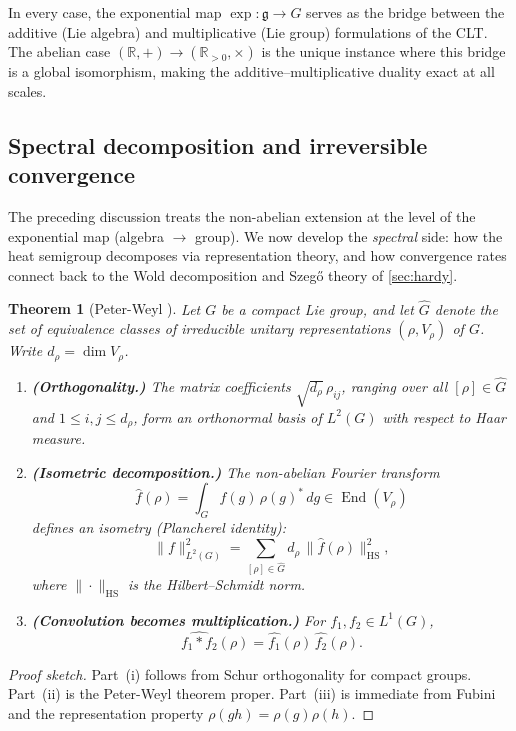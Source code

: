 \documentclass[12pt]{amsart}
\newtheorem{theorem}{Theorem}[section]
\theoremstyle{definition}
\theoremstyle{remark}
\newcommand{\R}{\mathbb{R}}
\newcommand{\Rpos}{\mathbb{R}_{>0}}
\begin{document}
\noindent In every case, the exponential map $\exp : \mathfrak{g} \to G$ serves as the bridge between the additive (Lie algebra) and multiplicative (Lie group) formulations of the CLT. The abelian case $(\R, +) \to (\Rpos, \times)$ is the unique instance where this bridge is a global isomorphism, making the additive--multiplicative duality exact at all scales.

\subsection*{Spectral decomposition and irreversible convergence}

The preceding discussion treats the non-abelian extension at the level of the exponential map (algebra $\to$ group). We now develop the \emph{spectral} side: how the heat semigroup decomposes via representation theory, and how convergence rates connect back to the Wold decomposition and Szeg\H{o} theory of \cref{sec:hardy}.

\begin{theorem}[Peter-Weyl {\cite[Theorem~4.28]{Hall}}]\label{thm:peter-weyl}
Let $G$ be a compact Lie group, and let $\widehat{G}$ denote the set of equivalence classes of irreducible unitary representations $(\rho, V_\rho)$ of $G$. Write $d_\rho = \dim V_\rho$.
\begin{enumerate}[label=(\roman*)]
\item \textbf{(Orthogonality.)} The matrix coefficients $\sqrt{d_\rho}\, \rho_{ij}$, ranging over all $[\rho] \in \widehat{G}$ and $1 \leq i, j \leq d_\rho$, form an orthonormal basis of $L^2(G)$ with respect to Haar measure.

\item \textbf{(Isometric decomposition.)} The non-abelian Fourier transform
\[
\widehat{f}(\rho) = \int_G f(g)\, \rho(g)^*\, dg \in \operatorname{End}(V_\rho)
\]
defines an isometry (Plancherel identity):
\[
\|f\|_{L^2(G)}^2 = \sum_{[\rho] \in \widehat{G}} d_\rho\, \|\widehat{f}(\rho)\|_{\mathrm{HS}}^2,
\]
where $\|\cdot\|_{\mathrm{HS}}$ is the Hilbert--Schmidt norm.

\item \textbf{(Convolution becomes multiplication.)} For $f_1, f_2 \in L^1(G)$,
\[
\widehat{f_1 * f_2}(\rho) = \widehat{f_1}(\rho)\, \widehat{f_2}(\rho).
\]
\end{enumerate}
\end{theorem}

\begin{proof}[Proof sketch]
Part~(i) follows from Schur orthogonality for compact groups. Part~(ii) is the Peter-Weyl theorem proper. Part~(iii) is immediate from Fubini and the representation property $\rho(gh) = \rho(g)\rho(h)$.
\end{proof}
\end{document}
